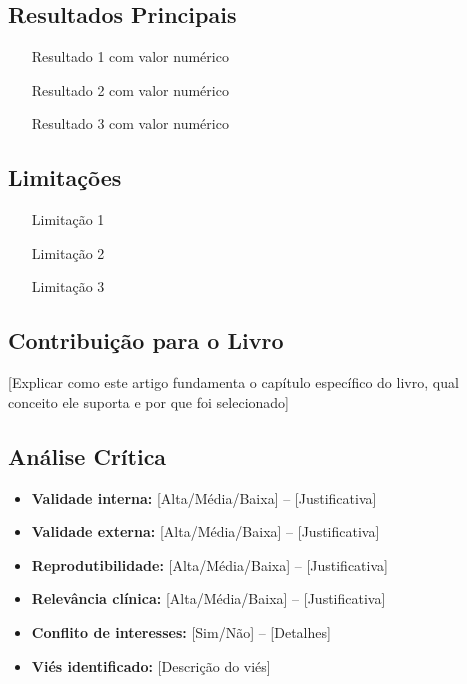 \subsection{Resultados Principais}
\begin{itemize}
  \item [Resultado 1 com valor numérico]
  \item [Resultado 2 com valor numérico]
  \item [Resultado 3 com valor numérico]
\end{itemize}

\subsection{Limitações}
\begin{itemize}
  \item [Limitação 1]
  \item [Limitação 2]
  \item [Limitação 3]
\end{itemize}

\subsection{Contribuição para o Livro}
[Explicar como este artigo fundamenta o capítulo específico do livro, qual conceito ele suporta e por que foi selecionado]

\subsection{Análise Crítica}
\begin{itemize}
  \item \textbf{Validade interna:} [Alta/Média/Baixa] -- [Justificativa]
  \item \textbf{Validade externa:} [Alta/Média/Baixa] -- [Justificativa]
  \item \textbf{Reprodutibilidade:} [Alta/Média/Baixa] -- [Justificativa]
  \item \textbf{Relevância clínica:} [Alta/Média/Baixa] -- [Justificativa]
  \item \textbf{Conflito de interesses:} [Sim/Não] -- [Detalhes]
  \item \textbf{Viés identificado:} [Descrição do viés]
\end{itemize}

